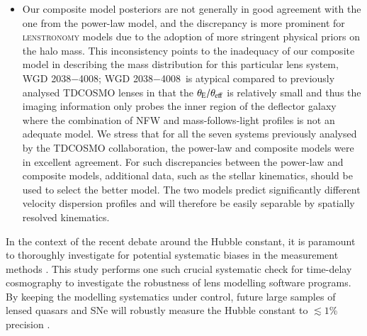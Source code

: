 \documentclass[longauth]{aa}
\newcommand{\lensname}{WGD 2038$-$4008}
\newcommand{\ajsiii}[1]{{{#1}}}
\newcommand{\ajsiv}[1]{{{#1}}}
\newcommand{\kw}[1]{{{#1}}}
\newcommand{\suyu}[1]{{{#1}}}
\begin{document}
\begin{itemize}
        \item Our composite model posteriors are not generally in good agreement with the one from the power-law model, and the discrepancy is more prominent for \textsc{lenstronomy} models due to the adoption of more stringent physical priors on the halo mass. This inconsistency points to the inadequacy of our composite model in describing the mass distribution \suyu{for this particular lens system, \lensname;} %
        \lensname\ is atypical compared to previously analysed TDCOSMO lenses in that the \ajsiii{$\theta_{\rm E}/\theta_{\rm eff}$} %
        is relatively small and thus the imaging information only probes the inner region of the deflector galaxy where the combination of NFW and mass-follows-light profiles is not an adequate model. \ajsiv{We stress that for all the seven systems previously analysed by the TDCOSMO collaboration, the power-law and composite models were in excellent agreement.} For such discrepancies between the power-law and composite models, additional data, such as the stellar kinematics, should be used to select the better model. \ajsiv{The two models predict significantly different velocity dispersion profiles and will therefore be easily separable by spatially resolved kinematics.}
\end{itemize}
%

In the context of the recent debate around the Hubble constant, it is paramount to thoroughly investigate for potential systematic biases in the measurement methods \citep[e.g.][]{Freedman21, Riess22}. This study performs one such crucial systematic check for time-delay cosmography to investigate the robustness of lens modelling software programs. By keeping the modelling systematics under control, future large samples of lensed quasars and SNe will robustly measure the Hubble constant to $\lesssim1$\% precision \citep[e.g.][]{Jee16, Birrer21c, Birrer22}.
\end{document}
